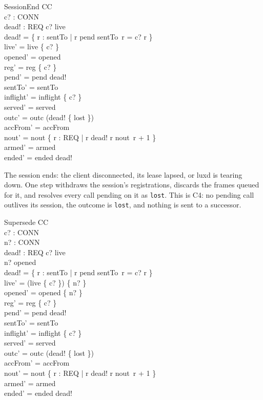 \documentclass[a4paper,10pt,fleqn]{article}
\begin{document}
\begin{schema}{SessionEnd}
  \Delta CC \\
  c? : CONN \\
  dead! : \power REQ
\where
  c? \in live \\
  dead! = \{ r : \dom sentTo | r \in pend \land sentTo~r = c? \spot r \} \\
  live' = live \setminus \{ c? \} \\
  opened' = opened \\
  reg' = reg \nrres \{ c? \} \\
  pend' = pend \setminus dead! \\
  sentTo' = sentTo \\
  inflight' = inflight \nrres \{ c? \} \\
  served' = served \\
  outc' = outc \oplus (dead! \cross \{ lost \}) \\
  accFrom' = accFrom \\
  nout' = nout \oplus
    \{ r : REQ | r \in dead! \spot r \mapsto nout~r + 1 \} \\
  armed' = armed \\
  ended' = ended \cup dead!
\end{schema}

The session ends: the client disconnected, its lease lapsed, or luxd is
tearing down.  One step withdraws the session's registrations, discards the
frames queued for it, and resolves every call pending on it as
\texttt{lost}.  This is C4: no pending call outlives its session, the outcome
is \texttt{lost}, and nothing is sent to a successor.

\begin{schema}{Supersede}
  \Delta CC \\
  c? : CONN \\
  n? : CONN \\
  dead! : \power REQ
\where
  c? \in live \\
  n? \notin opened \\
  dead! = \{ r : \dom sentTo | r \in pend \land sentTo~r = c? \spot r \} \\
  live' = (live \setminus \{ c? \}) \cup \{ n? \} \\
  opened' = opened \cup \{ n? \} \\
  reg' = reg \nrres \{ c? \} \\
  pend' = pend \setminus dead! \\
  sentTo' = sentTo \\
  inflight' = inflight \nrres \{ c? \} \\
  served' = served \\
  outc' = outc \oplus (dead! \cross \{ lost \}) \\
  accFrom' = accFrom \\
  nout' = nout \oplus
    \{ r : REQ | r \in dead! \spot r \mapsto nout~r + 1 \} \\
  armed' = armed \\
  ended' = ended \cup dead!
\end{schema}
\end{document}
